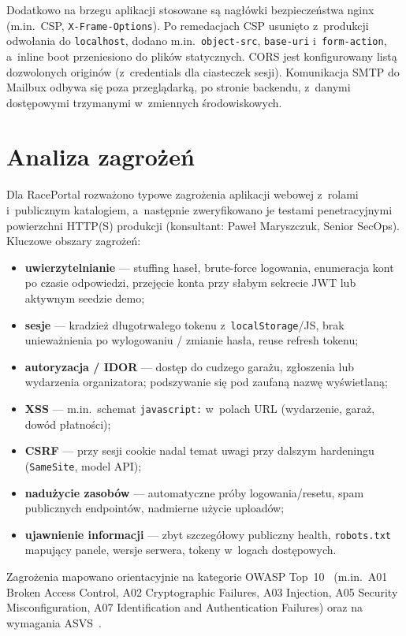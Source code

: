 \documentclass{sprz}
\begin{document}
Dodatkowo na brzegu aplikacji stosowane są nagłówki bezpieczeństwa nginx (m.in.\ CSP, \texttt{X-Frame-Options}). Po remedacjach CSP usunięto z~produkcji odwołania do \texttt{localhost}, dodano m.in.\ \texttt{object-src}, \texttt{base-uri} i~\texttt{form-action}, a~inline boot przeniesiono do plików statycznych. CORS jest konfigurowany listą dozwolonych originów (z~credentials dla ciasteczek sesji). Komunikacja SMTP do Mailbux odbywa się poza przeglądarką, po stronie backendu, z~danymi dostępowymi trzymanymi w~zmiennych środowiskowych.

\section{Analiza zagrożeń}
Dla RacePortal rozważono typowe zagrożenia aplikacji webowej z~rolami i~publicznym katalogiem, a~następnie zweryfikowano je testami penetracyjnymi powierzchni HTTP(S) produkcji (konsultant: Paweł Maryszczuk, Senior SecOps). Kluczowe obszary zagrożeń:
\begin{itemize}
  \item \textbf{uwierzytelnianie} --- stuffing haseł, brute-force logowania, enumeracja kont po czasie odpowiedzi, przejęcie konta przy słabym sekrecie JWT lub aktywnym seedzie demo;
  \item \textbf{sesje} --- kradzież długotrwałego tokenu z~\texttt{localStorage}/JS, brak unieważnienia po wylogowaniu / zmianie hasła, reuse refresh tokenu;
  \item \textbf{autoryzacja / IDOR} --- dostęp do cudzego garażu, zgłoszenia lub wydarzenia organizatora; podszywanie się pod zaufaną nazwę wyświetlaną;
  \item \textbf{XSS} --- m.in.\ schemat \texttt{javascript:} w~polach URL (wydarzenie, garaż, dowód płatności);
  \item \textbf{CSRF} --- przy sesji cookie nadal temat uwagi przy dalszym hardeningu (\texttt{SameSite}, model API);
  \item \textbf{nadużycie zasobów} --- automatyczne próby logowania/resetu, spam publicznych endpointów, nadmierne użycie uploadów;
  \item \textbf{ujawnienie informacji} --- zbyt szczegółowy publiczny health, \texttt{robots.txt} mapujący panele, wersje serwera, tokeny w~logach dostępowych.
\end{itemize}
Zagrożenia mapowano orientacyjnie na kategorie OWASP Top~10~\cite{owasp:top10} (m.in.\ A01 Broken Access Control, A02 Cryptographic Failures, A03 Injection, A05 Security Misconfiguration, A07 Identification and Authentication Failures) oraz na wymagania ASVS~\cite{owasp:asvs}.
\end{document}

